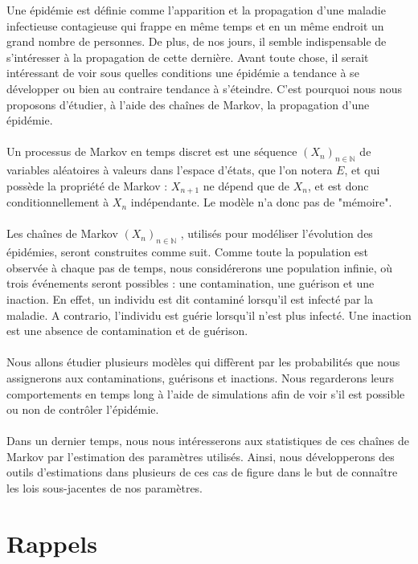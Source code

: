 \documentclass[12pt,a4paper]{report}
\theoremstyle{remark}
\begin{document}
Une épidémie est définie comme l'apparition et la propagation d'une maladie infectieuse contagieuse qui frappe en même temps et en un même endroit un grand nombre de personnes. De plus, de nos jours, il semble indispensable de s'intéresser à la propagation de cette dernière. Avant toute chose, il serait intéressant de voir sous quelles conditions une épidémie a tendance à se développer ou bien au contraire tendance à s'éteindre. C'est pourquoi nous nous proposons d'étudier, à l'aide des chaînes de Markov, la propagation d'une épidémie.
\\
\\
Un processus de Markov en temps discret est une séquence $(X_n)_{n\in\mathbb{N}}$ de variables aléatoires à valeurs dans l'espace d'états, que l'on notera $E$, et qui possède la propriété de Markov : $X_{n+1}$ ne dépend que de $X_n$, et est donc conditionnellement à $X_n$ indépendante. Le modèle n'a donc pas de "mémoire".
\\
\\
Les chaînes de Markov $(X_n)_{n \in \mathbb{N}}$ , utilisés pour modéliser l'évolution des épidémies, seront construites comme suit. Comme toute la population est observée à chaque pas de temps, nous considérerons une population infinie, où trois événements seront possibles : une contamination, une guérison et une inaction. En effet, un individu est dit contaminé lorsqu'il est infecté par la maladie. A contrario, l'individu est guérie lorsqu'il n'est plus infecté. Une inaction est une absence de contamination et de guérison. 
\\
\\
Nous allons étudier plusieurs modèles qui diffèrent par les probabilités que nous assignerons aux contaminations, guérisons et inactions. Nous regarderons leurs comportements en temps long à l'aide de simulations afin de voir s'il est possible ou non de contrôler l'épidémie.
\\
\\
Dans un dernier temps, nous nous intéresserons aux statistiques de ces chaînes de Markov par l'estimation des paramètres utilisés. Ainsi, nous développerons des outils d'estimations dans plusieurs de ces cas de figure dans le but de connaître les lois sous-jacentes de nos paramètres. 

\newpage
\chapter*{Rappels}
\end{document}
